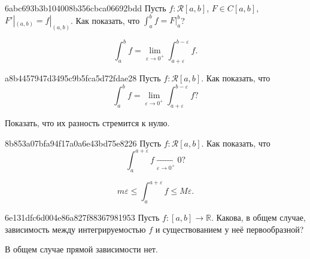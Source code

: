 \begin{note}{6abc693b3b104008b356cbca06692bdd}
    Пусть \({ f : \mathcal R[a, b] }\), \({ F \in C[a, b] }\), \({ F'|_{(a, b)} = f|_{(a, b)} }\).
    Как показать, что \({ \int_{a}^{b} f = F\big|_{a}^{b} }\)?

    \begin{cloze}{1}
        \[
            \int_{a}^{b} f  = \lim_{\varepsilon \to 0^{+}} \int_{a + \varepsilon}^{b - \varepsilon} f.
        \]
    \end{cloze}
\end{note}

\begin{note}{a8b4457947d3495c9b5fca5d72fdae28}
    Пусть \({ f : \mathcal R[a, b] }\). Как показать, что
    \[
        \int_{a}^{b} f = \lim_{\varepsilon \to 0^{+}} \int_{a + \varepsilon}^{b - \varepsilon} f?
    \]

    \begin{cloze}{1}
        Показать, что их разность стремится к нулю.
    \end{cloze}
\end{note}

\begin{note}{8b853a07bfa94f17a0a6e43bd75e8226}
    Пусть \({ f : \mathcal R[a, b] }\). Как показать, что
    \[
        \int_{a}^{a + \varepsilon} f \underset{\varepsilon \to 0^{+}}\longrightarrow 0?
    \]

    \begin{cloze}{1}
        \[
            m\varepsilon \leqslant \int_{a}^{a + \varepsilon} f \leqslant M\varepsilon.
        \]
    \end{cloze}
\end{note}

\begin{note}{6e131dfc6d004e86a827f88367981953}
    Пусть \({ f : [a, b] \to \mathbb R }\).
    Какова, в общем случае, зависимость между интегрируемостью \({ f }\) и существованием у неё первообразной?

    \begin{cloze}{1}
        В общем случае прямой зависимости нет.
    \end{cloze}
\end{note}


